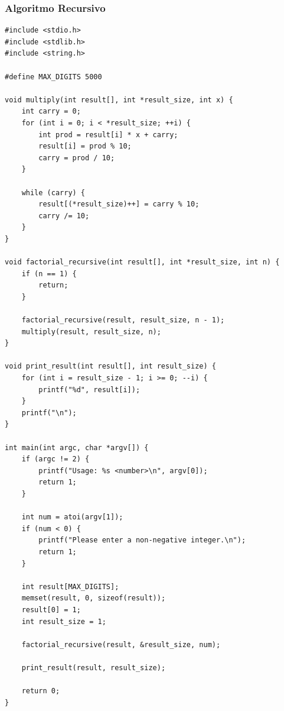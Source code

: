 \documentclass[12pt]{article}
\begin{document}
\subsubsection{Algoritmo Recursivo}
\begin{verbatim}
#include <stdio.h>
#include <stdlib.h>
#include <string.h>

#define MAX_DIGITS 5000

void multiply(int result[], int *result_size, int x) {
    int carry = 0;
    for (int i = 0; i < *result_size; ++i) {
        int prod = result[i] * x + carry;
        result[i] = prod % 10;
        carry = prod / 10;
    }

    while (carry) {
        result[(*result_size)++] = carry % 10;
        carry /= 10;
    }
}

void factorial_recursive(int result[], int *result_size, int n) {
    if (n == 1) {
        return;
    }

    factorial_recursive(result, result_size, n - 1);
    multiply(result, result_size, n);
}

void print_result(int result[], int result_size) {
    for (int i = result_size - 1; i >= 0; --i) {
        printf("%d", result[i]);
    }
    printf("\n");
}

int main(int argc, char *argv[]) {
    if (argc != 2) {
        printf("Usage: %s <number>\n", argv[0]);
        return 1;
    }

    int num = atoi(argv[1]);
    if (num < 0) {
        printf("Please enter a non-negative integer.\n");
        return 1;
    }

    int result[MAX_DIGITS];
    memset(result, 0, sizeof(result));
    result[0] = 1;
    int result_size = 1;

    factorial_recursive(result, &result_size, num);

    print_result(result, result_size);

    return 0;
}
\end{verbatim}
\end{document}
